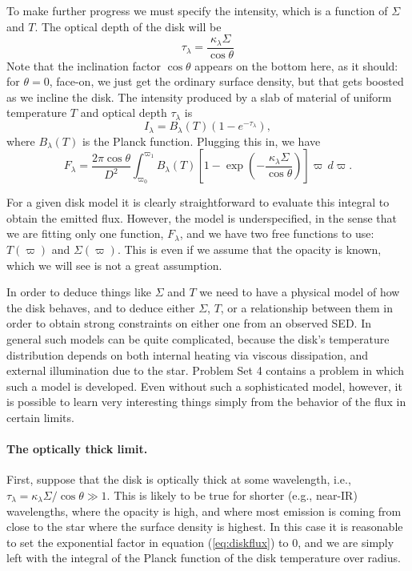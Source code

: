 To make further progress we must specify the intensity, which is a function of $\Sigma$ and $T$. The optical depth of the disk will be
\begin{equation}
\tau_{\lambda} = \frac{\kappa_{\lambda}\Sigma}{\cos\theta}
\end{equation}
Note that the inclination factor $\cos\theta$ appears on the bottom here, as it should: for $\theta=0$, face-on, we just get the ordinary surface density, but that gets boosted as we incline the disk. The intensity produced by a slab of material of uniform temperature $T$ and optical depth $\tau_{\lambda}$ is
\begin{equation}
I_{\lambda} = B_{\lambda}(T) \left(1-e^{-\tau_{\lambda}}\right),
\end{equation}
where $B_{\lambda}(T)$ is the Planck function. Plugging this in, we have
\begin{equation}
\label{eq:diskflux}
F_{\lambda} = \frac{2\pi \cos\theta}{D^2} \int_{\varpi_0}^{\varpi_1} B_{\lambda}(T) \left[1-\exp\left(-\frac{\kappa_{\lambda}\Sigma}{\cos\theta}\right)\right] \varpi\, d\varpi.
\end{equation}

For a given disk model it is clearly straightforward to evaluate this integral to obtain the emitted flux. However, the model is underspecified, in the sense that we are fitting only one function, $F_{\lambda}$, and we have two free functions to use: $T(\varpi)$ and $\Sigma(\varpi)$. This is even if we assume that the opacity is known, which we will see is not a great assumption.

In order to deduce things like $\Sigma$ and $T$ we need to have a physical model of how the disk behaves, and to deduce either $\Sigma$, $T$, or a relationship between them in order to obtain strong constraints on either one from an observed SED. In general such models can be quite complicated, because the disk's temperature distribution depends on both internal heating via viscous dissipation, and external illumination due to the star. Problem Set 4 contains a problem in which such a model is developed. Even without such a sophisticated model, however, it is possible to learn very interesting things simply from the behavior of the flux in certain limits.

\paragraph{The optically thick limit.}

First, suppose that the disk is optically thick at some wavelength, i.e., $\tau_{\lambda} = \kappa_{\lambda}\Sigma/\cos\theta \gg 1$. This is likely to be true for shorter (e.g., near-IR) wavelengths, where the opacity is high, and where most emission is coming from close to the star where the surface density is highest. In this case it is reasonable to set the exponential factor in equation (\ref{eq:diskflux}) to 0, and we are simply left with the integral of the Planck function of the disk temperature over radius.

